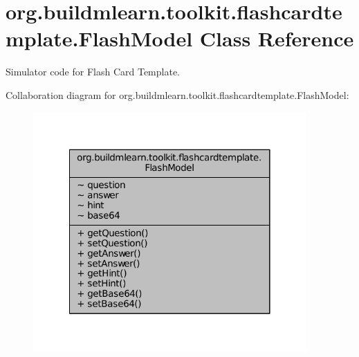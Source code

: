 \hypertarget{classorg_1_1buildmlearn_1_1toolkit_1_1flashcardtemplate_1_1FlashModel}{\section{org.\-buildmlearn.\-toolkit.\-flashcardtemplate.\-Flash\-Model Class Reference}
\label{classorg_1_1buildmlearn_1_1toolkit_1_1flashcardtemplate_1_1FlashModel}
}


Simulator code for Flash Card Template.  




Collaboration diagram for org.\-buildmlearn.\-toolkit.\-flashcardtemplate.\-Flash\-Model\-:
\nopagebreak
\begin{figure}[H]
\begin{center}
\leavevmode
\includegraphics[width=296pt]{d1/d4f/classorg_1_1buildmlearn_1_1toolkit_1_1flashcardtemplate_1_1FlashModel__coll__graph}
\end{center}
\end{figure}
